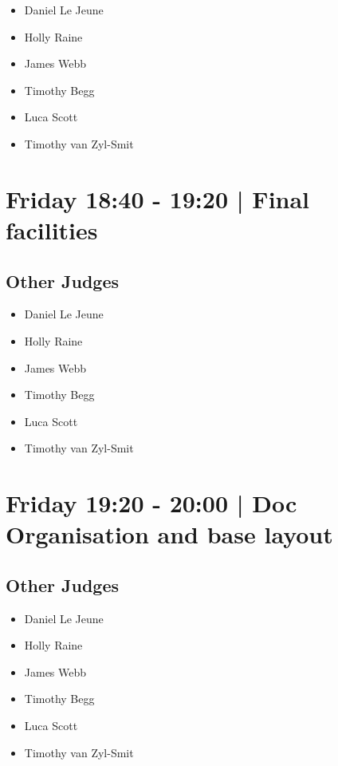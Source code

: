 \documentclass[10pt, A5]{article}
\begin{document}
            \begin{itemize}
                            \item Daniel Le Jeune
                            \item Holly Raine
                            \item James Webb
                            \item Timothy Begg
                            \item Luca Scott
                            \item Timothy van Zyl-Smit
                        \end{itemize}
        

            \section*{Friday 18:40
        -
        19:20
        |
         Final facilities}
        
                
        \subsection*{Other Judges}
        
            \begin{itemize}
                            \item Daniel Le Jeune
                            \item Holly Raine
                            \item James Webb
                            \item Timothy Begg
                            \item Luca Scott
                            \item Timothy van Zyl-Smit
                        \end{itemize}
        

            \section*{Friday 19:20
        -
        20:00
        |
         Doc Organisation and base layout}
        
                
        \subsection*{Other Judges}
        
            \begin{itemize}
                            \item Daniel Le Jeune
                            \item Holly Raine
                            \item James Webb
                            \item Timothy Begg
                            \item Luca Scott
                            \item Timothy van Zyl-Smit
                        \end{itemize}
        
\end{document}
